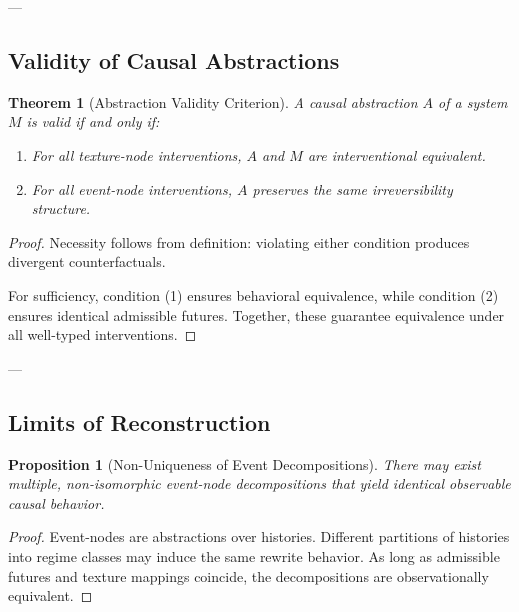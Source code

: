 \documentclass[11pt]{article}
\newtheorem{proposition}{Proposition}
\newtheorem{theorem}{Theorem}
\theoremstyle{remark}
\begin{document}
---

\subsection{Validity of Causal Abstractions}

\begin{theorem}[Abstraction Validity Criterion]
A causal abstraction \(A\) of a system \(M\) is valid if and only if:
\begin{enumerate}
\item For all texture-node interventions, \(A\) and \(M\) are interventional equivalent.
\item For all event-node interventions, \(A\) preserves the same irreversibility structure.
\end{enumerate}
\end{theorem}

\begin{proof}
Necessity follows from definition: violating either condition produces divergent counterfactuals.

For sufficiency, condition (1) ensures behavioral equivalence,
while condition (2) ensures identical admissible futures.
Together, these guarantee equivalence under all well-typed interventions.
\end{proof}

---

\subsection{Limits of Reconstruction}

\begin{proposition}[Non-Uniqueness of Event Decompositions]
There may exist multiple, non-isomorphic event-node decompositions
that yield identical observable causal behavior.
\end{proposition}

\begin{proof}
Event-nodes are abstractions over histories.
Different partitions of histories into regime classes may induce the same rewrite behavior.
As long as admissible futures and texture mappings coincide, the decompositions are observationally equivalent.
\end{proof}
\end{document}
